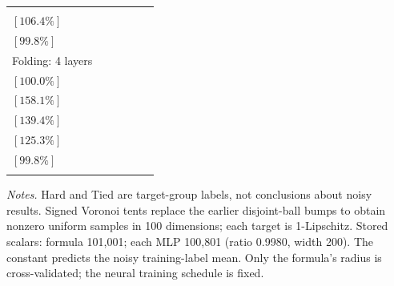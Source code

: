 \begin{table}[t]
\begin{subtable}{\textwidth}
{\begin{tabular}{@{}lccccc@{}}
  \shortstack{$(1.278\pm 0.055)\times10^{-1}$\\$[106.4\%]$} &
  \shortstack{$(1.200\pm 0.036)\times10^{-1}$\\$[99.8\%]$} \\
\addlinespace[3pt]
Folding: 4 layers &
  \shortstack{$(4.229\pm 0.278)\times10^{-2}$\\$[100.0\%]$} &
  \shortstack{$(6.687\pm 0.439)\times10^{-2}$\\$[158.1\%]$} &
  \shortstack{$(5.894\pm 0.230)\times10^{-2}$\\$[139.4\%]$} &
  \shortstack{$(5.301\pm 0.362)\times10^{-2}$\\$[125.3\%]$} &
  \shortstack{$(4.221\pm 0.265)\times10^{-2}$\\$[99.8\%]$} \\
\addlinespace[3pt]
\bottomrule
\end{tabular}%
}
\end{subtable}
\par\smallskip
\begin{minipage}{\textwidth}
\footnotesize
\emph{Notes.} Hard and Tied are target-group labels, not conclusions about noisy results. Signed Voronoi tents replace the earlier disjoint-ball bumps to obtain nonzero uniform samples in 100 dimensions; each target is 1-Lipschitz. Stored scalars: formula 101,001; each MLP 100,801 (ratio 0.9980, width 200). The constant predicts the noisy training-label mean. Only the formula's radius is cross-validated; the neural training schedule is fixed.
\end{minipage}
\end{table}
